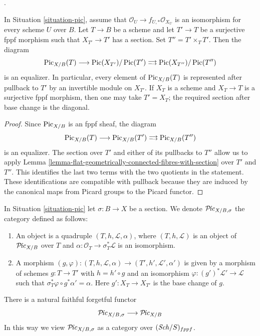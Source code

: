 \begin{lemma}
\label{lemma-picard-cech-quotient-with-local-section}
\begin{reference}
\cite[Expos\'e 232, Remark 2.6, p. 148]{FGA}.
\end{reference}
In Situation \ref{situation-pic}, assume that
$\mathcal{O}_U \to f_{U, *}\mathcal{O}_{X_U}$ is an isomorphism for every
scheme $U$ over $B$. Let $T \to B$ be a scheme and let $T' \to T$ be a
surjective fppf morphism such that $X_{T'} \to T'$ has a section. Set
$T'' = T' \times_T T'$. Then the diagram
$$
\mathrm{Pic}_{X/B}(T) \longrightarrow
\mathop{\mathrm{Pic}}\nolimits(X_{T'})/\mathop{\mathrm{Pic}}\nolimits(T')
\mathrel{\substack{\longrightarrow \\[-0.6ex] \longrightarrow}}
\mathop{\mathrm{Pic}}\nolimits(X_{T''})/\mathop{\mathrm{Pic}}\nolimits(T'')
$$
is an equalizer. In particular, every element of
$\mathrm{Pic}_{X/B}(T)$ is represented after pullback to $T'$ by an
invertible module on $X_{T'}$. If $X_T$ is a scheme and $X_T \to T$ is a
surjective fppf morphism, then one may take $T' = X_T$; the required section
after base change is the diagonal.
\end{lemma}

\begin{proof}
Since $\mathrm{Pic}_{X/B}$ is an fppf sheaf, the diagram
$$
\mathrm{Pic}_{X/B}(T) \longrightarrow
\mathrm{Pic}_{X/B}(T')
\mathrel{\substack{\longrightarrow \\[-0.6ex] \longrightarrow}}
\mathrm{Pic}_{X/B}(T'')
$$
is an equalizer. The section over $T'$ and either of its pullbacks to
$T''$ allow us to apply
Lemma \ref{lemma-flat-geometrically-connected-fibres-with-section} over
$T'$ and $T''$. This identifies the last two terms with the two quotients
in the statement. These identifications are compatible with pullback
because they are induced by the canonical maps from Picard groups to the
Picard functor.
\end{proof}

\noindent
In Situation \ref{situation-pic} let $\sigma : B \to X$ be a section.
We denote $\mathcal{P}\!\mathit{ic}_{X/B, \sigma}$ the category defined as follows:
\begin{enumerate}
\item An object is a quadruple $(T, h, \mathcal{L}, \alpha)$, where
$(T, h, \mathcal{L})$ is an object of $\mathcal{P}\!\mathit{ic}_{X/B}$ over $T$ and
$\alpha : \mathcal{O}_T \to \sigma_T^*\mathcal{L}$
is an isomorphism.
\item A morphism $(g, \varphi) : (T, h, \mathcal{L}, \alpha)
\to (T', h', \mathcal{L}', \alpha')$
is given by a morphism of schemes $g : T \to T'$ with $h = h' \circ g$
and an isomorphism $\varphi : (g')^*\mathcal{L}' \to \mathcal{L}$
such that $\sigma_T^*\varphi \circ g^*\alpha' = \alpha$.
Here $g' : X_T \to X_{T'}$ is the base change of $g$.
\end{enumerate}
There is a natural faithful forgetful functor
$$
\mathcal{P}\!\mathit{ic}_{X/B, \sigma} \longrightarrow
\mathcal{P}\!\mathit{ic}_{X/B}
$$
In this way we view $\mathcal{P}\!\mathit{ic}_{X/B, \sigma}$ as a category
over $(\mathit{Sch}/S)_{fppf}$.

